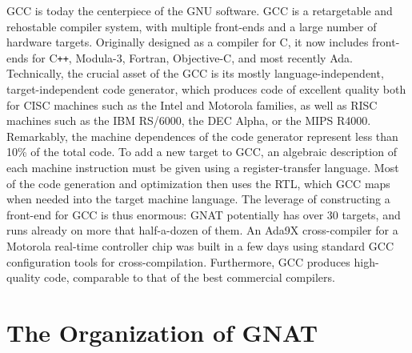 GCC is today the centerpiece of the GNU software. GCC is a
retargetable and rehostable compiler system, with multiple front-ends
and a large number of hardware targets. Originally designed as a
compiler for C, it now includes front-ends for C{\tt ++}, Modula-3,
Fortran, Objective-C, and most recently Ada. Technically, the crucial
asset of the GCC is its mostly language-independent,
target-independent code generator, which produces code of excellent
quality both for CISC machines such as the Intel and Motorola
families, as well as RISC machines such as the IBM RS/6000, the DEC
Alpha, or the MIPS R4000. Remarkably, the machine dependences of the
code generator represent less than 10\% of the total code.  To add a
new target to GCC, an algebraic description of each machine
instruction must be given using a register-transfer language. Most of
the code generation and optimization then uses the RTL, which GCC maps
when needed into the target machine language. The leverage of
constructing a front-end for GCC is thus enormous: GNAT potentially
has over 30 targets, and runs already on more that half-a-dozen of
them. An Ada9X cross-compiler for a Motorola real-time controller chip
was built in a few days using standard GCC configuration tools for
cross-compilation. Furthermore, GCC produces high-quality code,
comparable to that of the best commercial compilers.

\section{The Organization of GNAT}

